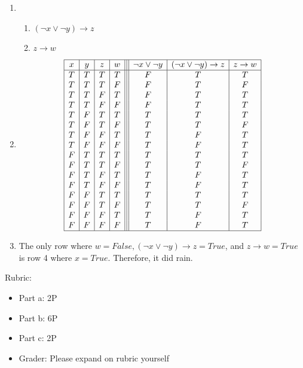 \documentclass{article}
\theoremstyle{definition}
\begin{document}
\begin{solution}
	\begin{enumerate}
	\item 
		\begin{enumerate}
			\item $(\neg x \vee \neg y) \to z$
			\item $z \to w$
		\end{enumerate}
	\item 
	\[\begin{array}{| c | c | c | c | || c | c | c |}
	\hline
	x & y & z & w & \neg x \vee \neg y &(\neg x \vee \neg y) \to z & z \to w\\
	\hline
		T & T & T & T & F & T & T\\
		T & T & T & F & F & T & F\\
		T & T & F & T & F & T & T\\
		T & T & F & F & F & T & T\\
		T & F & T & T & T & T & T\\
		T & F & T & F & T & T & F\\
		T & F & F & T & T & F & T\\
		T & F & F & F & T & F & T\\
		F & T & T & T & T & T & T\\
		F & T & T & F & T & T & F\\
		F & T & F & T & T & F & T\\
		F & T & F & F & T & F & T\\
		F & F & T & T & T & T & T\\
		F & F & T & F & T & T & F\\
		F & F & F & T & T & F & T\\
		F & F & F & F & T & F & T\\
	\hline
	\end{array}\]
	\item The only row where $w=False, (\neg x \vee \neg y) \to z=True$, and $z \to w=True$ is row 4 where $x=True$. Therefore, it did rain.
	\end{enumerate}
{\color{red} Rubric:
\begin{itemize}
\item Part a: 2P
\item Part b: 6P
\item Part c: 2P 
\item Grader: Please expand on rubric yourself
\end{itemize}}
\end{solution}
\end{document}
